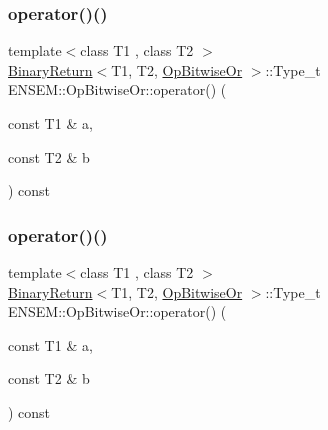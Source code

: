 \subsubsection{\texorpdfstring{operator()()}{operator()()}\hspace{0.1cm}{\footnotesize\ttfamily [1/3]}}
{\footnotesize\ttfamily template$<$class T1 , class T2 $>$ \\
\mbox{\hyperlink{structENSEM_1_1BinaryReturn}{Binary\+Return}}$<$T1, T2, \mbox{\hyperlink{structENSEM_1_1OpBitwiseOr}{Op\+Bitwise\+Or}} $>$\+::Type\+\_\+t E\+N\+S\+E\+M\+::\+Op\+Bitwise\+Or\+::operator() (\begin{DoxyParamCaption}\item[{const T1 \&}]{a,  }\item[{const T2 \&}]{b }\end{DoxyParamCaption}) const\hspace{0.3cm}{\ttfamily [inline]}}

\mbox{\label{structENSEM_1_1OpBitwiseOr_ad773d2df54ccbb80a46a0cd83b9ce226}} 
\subsubsection{\texorpdfstring{operator()()}{operator()()}\hspace{0.1cm}{\footnotesize\ttfamily [2/3]}}
{\footnotesize\ttfamily template$<$class T1 , class T2 $>$ \\
\mbox{\hyperlink{structENSEM_1_1BinaryReturn}{Binary\+Return}}$<$T1, T2, \mbox{\hyperlink{structENSEM_1_1OpBitwiseOr}{Op\+Bitwise\+Or}} $>$\+::Type\+\_\+t E\+N\+S\+E\+M\+::\+Op\+Bitwise\+Or\+::operator() (\begin{DoxyParamCaption}\item[{const T1 \&}]{a,  }\item[{const T2 \&}]{b }\end{DoxyParamCaption}) const\hspace{0.3cm}{\ttfamily [inline]}}

\mbox{\label{structENSEM_1_1OpBitwiseOr_ad773d2df54ccbb80a46a0cd83b9ce226}} 
